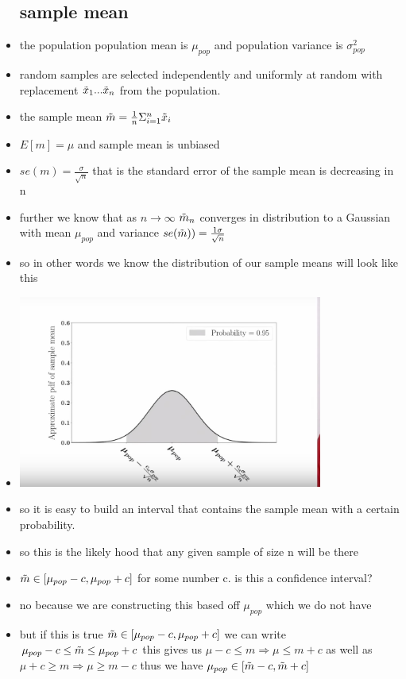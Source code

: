 \documentclass{article}
\begin{document}
\begin{itemize}
\subsection{sample mean}
\item the population population mean is $\mu_{pop}$ and population variance is $\sigma_{pop}^{2}$
\item random samples are selected independently and uniformly at random with replacement $\Tilde{x}_1...\Tilde{x}_n$ from the population. 
\item the sample mean $\Tilde{m}=\frac{1}{n}\Sigma_{i=1}^{n}\Tilde{x}_{i}$
\item $E[m]=\mu$ and sample mean is unbiased
\item $se(m)=\frac{\sigma}{\sqrt{n}}$ that is the standard error of the sample mean is decreasing in n 
\item further we know that as $n\rightarrow \infty$ $\Tilde{m}_{n}$ converges in distribution to a Gaussian with mean $\mu_{pop}$ and variance $se(\Tilde{m}))=\frac{1\sigma}{\sqrt{n}}$
\item so in other words we know the distribution of our sample means will look like this 
\item \includegraphics[width=10cm]{notes/week_4/vidio 4: Confidince Intervals/immages/v4_1.jpg}
\item so it is easy to build an interval that contains the sample mean with a certain probability.
\item so this is the likely hood that any given sample of size n will be there 
\item $\Tilde{m}\in [\mu_{pop}-c,\mu_{pop}+c]$ for some number c. is this a confidence interval? 
\item no because we are constructing this based off $\mu_{pop}$ which we do not have 
\item but if this is true  $\Tilde{m}\in [\mu_{pop}-c,\mu_{pop}+c]$ we can write $\mu_{pop}-c\leq \Tilde{m}\leq \mu_{pop}+c$ this gives us $\mu-c\leq m\Rightarrow \mu\leq m+c$ as well as $\mu+c\geq m\Rightarrow \mu\geq m-c$ thus we have  $\mu_{pop}\in [\Tilde{m}-c, \Tilde{m}+c]$

\end{itemize}
\end{document}
